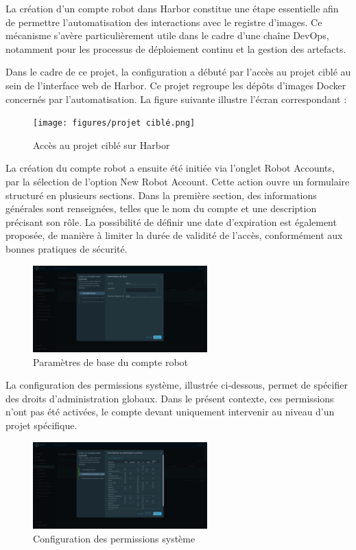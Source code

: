 La création d’un compte robot dans Harbor constitue une étape essentielle afin de permettre l’automatisation des interactions avec le registre d’images. Ce mécanisme s’avère particulièrement utile dans le cadre d’une chaîne DevOps, notamment pour les processus de déploiement continu et la gestion des artefacts.

Dans le cadre de ce projet, la configuration a débuté par l’accès au projet ciblé au sein de l’interface web de Harbor. Ce projet regroupe les dépôts d’images Docker concernés par l’automatisation. La figure suivante illustre l’écran correspondant :

\begin{figure}[H]
	\centering
	\texttt{[image: figures/projet ciblé.png]}
	\caption{Accès au projet ciblé sur Harbor}
\end{figure}

La création du compte robot a ensuite été initiée via l’onglet Robot Accounts, par la sélection de l’option New Robot Account. Cette action ouvre un formulaire structuré en plusieurs sections. Dans la première section, des informations générales sont renseignées, telles que le nom du compte et une description précisant son rôle. La possibilité de définir une date d’expiration est également proposée, de manière à limiter la durée de validité de l’accès, conformément aux bonnes pratiques de sécurité.

\begin{figure}[H]
	\centering
	\includegraphics[width=0.6\textwidth]{figures/harbor robot account informations de base.png}
	\caption{Paramètres de base du compte robot}
\end{figure}

La configuration des permissions système, illustrée ci-dessous, permet de spécifier des droits d’administration globaux. Dans le présent contexte, ces permissions n’ont pas été activées, le compte devant uniquement intervenir au niveau d’un projet spécifique.

\begin{figure}[H]
	\centering
	\includegraphics[width=0.6\textwidth]{figures/harbor robot account permissions systeme.png}
	\caption{Configuration des permissions système}
\end{figure}

